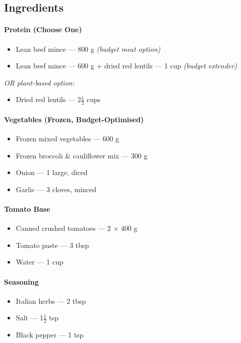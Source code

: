 \documentclass[11pt,a4paper]{article}
\begin{document}
\vspace{0.5em}

\subsection*{Ingredients}

\paragraph{Protein (Choose One)}
\begin{itemize}
    \item Lean beef mince — 800 g \emph{(budget meat option)}
    \item Lean beef mince — 600 g + dried red lentils — 1 cup \emph{(budget extender)}
\end{itemize}

\textit{OR plant-based option:}

\begin{itemize}
    \item Dried red lentils — 2$\tfrac{1}{2}$ cups
\end{itemize}

\paragraph{Vegetables (Frozen, Budget-Optimised)}
\begin{itemize}
    \item Frozen mixed vegetables — 600 g
    \item Frozen broccoli \& cauliflower mix — 300 g
    \item Onion — 1 large, diced
    \item Garlic — 3 cloves, minced
\end{itemize}

\paragraph{Tomato Base}
\begin{itemize}
    \item Canned crushed tomatoes — 2 $\times$ 400 g
    \item Tomato paste — 3 tbsp
    \item Water — 1 cup
\end{itemize}

\paragraph{Seasoning}
\begin{itemize}
    \item Italian herbs — 2 tbsp
    \item Salt — 1$\tfrac{1}{2}$ tsp
    \item Black pepper — 1 tsp
\end{itemize}
\end{document}
